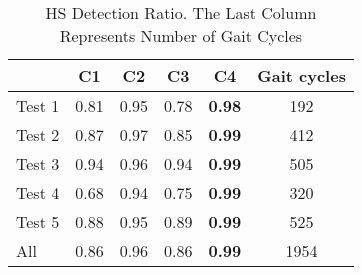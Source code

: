 \begin{table}[t]
	\centering
	\caption{HS Detection Ratio. The Last Column Represents Number of Gait Cycles}
	\label{tab:hs_detection_ratio}
	\begin{tabular}{@{}lccccc@{}}
		\hline
		    & C1   & C2   & C3   & C4   & Gait cycles \\ \hline
		Test 1 & 0.81 & 0.95 & 0.78 & \textbf{0.98} & 192 \\
		Test 2 & 0.87 & 0.97 & 0.85 & \textbf{0.99} & 412 \\
		Test 3 & 0.94 & 0.96 & 0.94 & \textbf{0.99} & 505 \\
		Test 4 & 0.68 & 0.94 & 0.75 & \textbf{0.99} & 320 \\
		Test 5 & 0.88 & 0.95 & 0.89 & \textbf{0.99} & 525 \\ \hline
		All    & 0.86 & 0.96 & 0.86 & \textbf{0.99} & 1954 \\ \hline
	\end{tabular}
    \vspace{-0.3cm}
\end{table}


